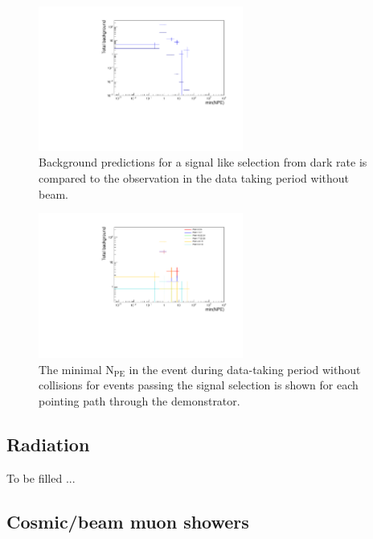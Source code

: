 \documentclass[12pt]{article}
\newcommand{\npe} {\mbox{\ensuremath{\textrm{N}_\textrm{PE}}}\xspace}
\begin{document}
\begin{figure}[ht!]
    \centering
    \includegraphics[width=0.6\textwidth]{figures/predictionAndMeasurementTimeWindow15}
    \caption{\label{fig:darkRate} Background predictions for a signal like selection
    from dark rate is compared to the observation in the data taking period without beam.} 
\end{figure}


\begin{figure}[ht!]
    \centering
    \includegraphics[width=0.6\textwidth]{figures/perPathPlotsNoBeam.pdf}
    \caption{\label{fig:perPathPlot} The minimal \npe in the event during data-taking period without
    collisions for events passing the signal selection is shown for each pointing path 
    through the demonstrator.}
\end{figure}

\subsection{Radiation}

To be filled ...

\subsection{Cosmic/beam muon showers}
\end{document}

